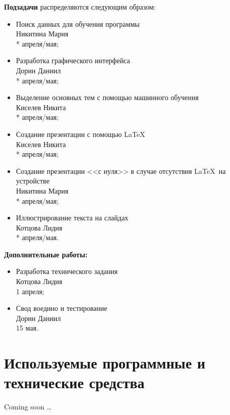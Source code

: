   \textbf{Подзадачи} распределяются следующим образом:
  \begin{itemize}
    \item Поиск данных для обучения программы \\ Никитина Мария \\ * апреля/мая;
    \item Разработка графического интерфейса \\ Дорин Даниил \\ * апреля/мая;
    \item Выделение основных тем с помощью машинного обучения \\ Киселев Никита \\ * апреля/мая;
    \item Создание презентации с помощью \LaTeX \\ Киселев Никита \\ * апреля/мая;
    \item Создание презентации <<с нуля>> в случае отсутствия \LaTeX~на устройстве \\ Никитина Мария \\ * апреля/мая;
    \item Иллюстрирование текста на слайдах \\ Котцова Лидия \\ * апреля/мая.
  \end{itemize}

  \textbf{Дополнительные работы:}
  \begin{itemize}
    \item Разработка технического задания \\ Котцова Лидия \\ 1 апреля;
    \item Свод воедино и тестирование \\ Дорин Даниил \\ 15 мая.
  \end{itemize}

  \section{Используемые программные и технические средства}

  \begin{center}
    Coming soon \ldots
  \end{center}

